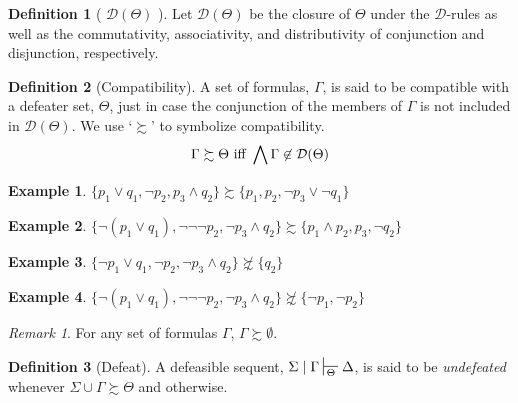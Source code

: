 \documentclass{article}
\theoremstyle{definition}
\theoremstyle{definition}
\theoremstyle{definition}
\theoremstyle{definition}
\newtheorem{definition}{Definition}
\theoremstyle{remark}
\newtheorem{remark}{Remark}
\theoremstyle{definition}
\newtheorem{example}{Example}
\theoremstyle{definition}
\begin{document}
\begin{definition}[\,\,$ \mathcal{D}(\Theta) $\,\,]\label{dclosure}
	Let $ \mathcal{D}(\Theta)$ be the closure of $ \Theta $ under the $ \mathcal{D}$-rules as well as the commutativity, associativity, and distributivity of conjunction and disjunction, respectively.
\end{definition}


\begin{definition}[Compatibility]\label{compat}
	A set of formulas, $\Gamma$, is said to be compatible with a defeater set, $\Theta $, just in case the conjunction of the members of $\Gamma$ is not included in $\mathcal{D}(\Theta)$. We use `$\succsim$' to symbolize compatibility.
 $$\Gamma \succsim \Theta \text{\,\,iff\,\,}  \bigwedge\Gamma \not\in \mathcal{D}(\Theta) $$

	
	\vspace{2mm}
	
	\begin{example}
		$ \{ p_1 \vee q_1,  \neg p_2, p_3 \wedge q_2 \} \succsim \{ p_1 , p_2, \neg p_3 \vee \neg q_1\} $
	\end{example}
	
	\begin{example}
		$ \{ \neg (p_1 \vee q_1),  \neg\neg\neg p_2, \neg p_3 \wedge q_2 \} \succsim \{ p_1 \wedge p_2 , p_3 , \neg q_2 \} $
	\end{example}
	
	\begin{example}
		$ \{ \neg p_1 \vee q_1,  \neg p_2, \neg p_3 \wedge q_2 \} \not\succsim \{ q_2 \} $
	\end{example}
	
	\begin{example}
		$ \{ \neg (p_1 \vee q_1),  \neg\neg\neg p_2, \neg p_3 \wedge q_2 \} \not\succsim \{ \neg p _1 , \neg p_2 \} $
	\end{example}
	
\end{definition}

\begin{remark}
	For any set of formulas $ \Gamma $, $ \Gamma \succsim \emptyset $.
\end{remark}


\begin{definition}[Defeat]\label{defeat}
	A defeasible sequent, $ \Sigma\mid\Gamma \sststile{\Theta}{} \Delta $, is said to be \textit{undefeated} whenever $ \Sigma\cup\Gamma\succsim\Theta$ and  otherwise.
\end{definition}
\end{document}
